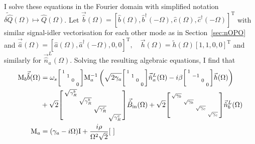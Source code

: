 I solve these equations in the Fourier domain with simplified notation $\tilde{\delta\hat{Q}}(\Omega)\mapsto\hat{Q}(\Omega)$. Let $\vec{\hat b}(\Omega)=[\hat b(\Omega), \hat b^\dag(-\Omega), \hat c(\Omega), \hat c^\dag(-\Omega)]^\text{T}$ with similar signal-idler vectorisation for each other mode as in Section~\ref{sec:nOPO} and $\vec{\hat a}(\Omega)=[\hat a(\Omega), \hat a^\dag(-\Omega),0,0]^\text{T},\quad \vec h(\Omega)=\tilde h(\Omega) [1,1,0,0]^\text{T}$ and similarly for $\vec{\hat n}^L_a(\Omega)$. Solving the resulting algebraic equations, I find that
\begin{align}
\mathrm{M}_b\vec{\hat{b}}(\Omega)&= \omega_s\begin{bsmallmatrix}
1 &  &  &  \\
 & 1 &  &  \\
 &  & 0 &  \\
 &  &  & 0
\end{bsmallmatrix}\mathrm{M}_a^{-1}\left(\sqrt{2\gamma_a}\begin{bsmallmatrix}
1 &  &  &  \\
 & 1 &  &  \\
 &  & 0 &  \\
 &  &  & 0
\end{bsmallmatrix}\vec{\hat{n}}^L_a(\Omega)-i\beta\begin{bsmallmatrix}
1 &  &  &  \\
 & -1 &  &  \\
 &  & 0 &  \\
 &  &  & 0
\end{bsmallmatrix}\vec{h}(\Omega)\right)\\&+ \sqrt{2}\begin{bsmallmatrix}
\sqrt{\gamma^b_R} &  &  &  \\
 & \sqrt{\gamma^b_R} &  &  \\
 &  & \sqrt{\gamma^c_R} &  \\
 &  &  & \sqrt{\gamma^c_R}
\end{bsmallmatrix}\vec{\hat B}_\mathrm{in}(\Omega) + \sqrt{2}\begin{bsmallmatrix}
\sqrt{\gamma_b} &  &  &  \\
 & \sqrt{\gamma_b} &  &  \\
 &  & \sqrt{\gamma_c} &  \\
 &  &  & \sqrt{\gamma_c}
\end{bsmallmatrix}\vec{\hat n}^L_b(\Omega)\\
\mathrm{M}_a &= (\gamma_a-i\Omega)\mathrm{I}+\frac{i\rho}{\Omega^2 \sqrt{2}}\begin{bsmallmatrix}

\end{bsmallmatrix}
\end{align}
